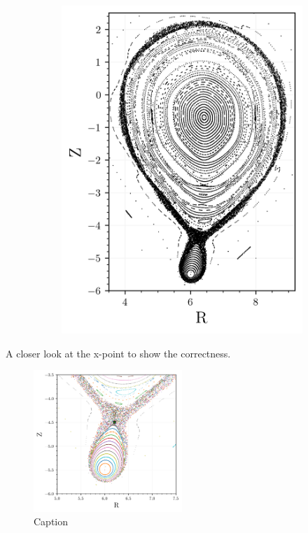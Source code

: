 \begin{figure}
\begin{subfigure}{0.41\textwidth}
        \includegraphics[width=\textwidth]{images/toytok/perturbed-6-1/perturbed_6_1.png}
        \caption{}
        \label{fig:toytok-61-p}
    \end{subfigure}
    \caption{}
    \label{fig:toytok-61}
\end{figure}

A closer look at the x-point to show the correctness.

\begin{figure}
    \centering
    \includegraphics[width=0.5\textwidth]{images/toytok/perturbed-6-1/perturbed_6_1_closer.png}
    \caption{Caption}
    \label{fig:enter-label}
\end{figure}

